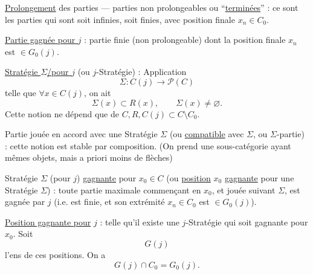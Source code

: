 \uline{Prolongement} des parties --- parties non prolongeables ou ``\uline{terminées}'' : ce sont les parties qui sont soit infinies, soit finies, avec   position finale $x_n\in C_0$.

\uline{Partie gagnée pour $j$} : partie finie (non prolongeable) dont la position finale $x_n$ est $\in G_0(j)$.

\uline{Stratégie $\Sigma$/pour $j$} (ou $j$-Stratégie) : Application
\[
\Sigma:C(j)\longrightarrow\mathcal P(C)
\]
telle que $\forall x\in C(j)$, on ait
\[
\Sigma(x)\subset R(x),\qquad\Sigma(x)\ne\varnothing.
\]
Cette notion ne dépend que de $C,R,C(j)\subset C\setminus C_0$.


Partie jouée en accord avec une Stratégie $\Sigma$ (ou \uline{compatible} avec $\Sigma$, ou $\Sigma$-partie) : cette notion est stable par composition. (On prend une sous-catégorie ayant mêmes objets, mais a priori moins de flèches)


Stratégie $\Sigma$ (pour $j$) \uline{gagnante} pour $x_0\in C$ (ou \uline{position} $x_0$ \uline{gagnante} pour une Stratégie $\Sigma$) : toute partie maximale commençant en $x_0$, et jouée suivant $\Sigma$, est gagnée par $j$ (i.e. est finie, et son extrémité $x_n\in C_0$ est $\in G_0(j)$).

\uline{Position  gagnante pour} $j$ : telle qu'il existe une $j$-Stratégie qui soit gagnante pour $x_0$. Soit
\[
G(j)
\]
l'ens de ces positions. On a
\[
G(j)\cap C_0=G_0(j).
\]

